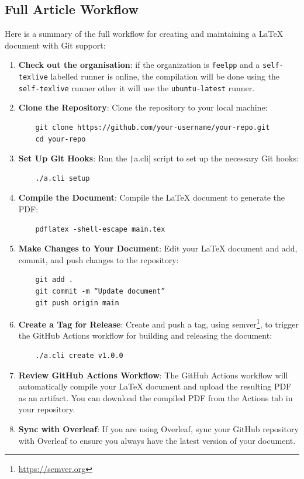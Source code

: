 \documentclass[a4paper]{article}
\begin{document}
\subsection{Full Article Workflow}
\label{sec:full-article-workflow}


Here is a summary of the full workflow for creating and maintaining a \LaTeX{} document with Git support:

\begin{enumerate}
    \item \textbf{Check out the organisation}: if the organization is \texttt{feelpp} and a \texttt{self-texlive} labelled runner is online, the compilation will be done using the \texttt{self-texlive} runner other it will use the \texttt{ubuntu-latest} runner.
    \item \textbf{Clone the Repository}:
    Clone the repository to your local machine:
    \begin{verbatim}
    git clone https://github.com/your-username/your-repo.git
    cd your-repo
    \end{verbatim}
    \item \textbf{Set Up Git Hooks}:
    Run the \texttt|a.cli| script to set up the necessary Git hooks:
    \begin{verbatim}
    ./a.cli setup
    \end{verbatim}
    \item  \textbf{Compile the Document}:
    Compile the \LaTeX{} document to generate the PDF:
    \begin{verbatim}
    pdflatex -shell-escape main.tex
    \end{verbatim}
    \item \textbf{Make Changes to Your Document}:
    Edit your \LaTeX{} document and add, commit, and push changes to the repository:
    \begin{verbatim}
    git add .
    git commit -m “Update document”
    git push origin main
    \end{verbatim}
    \item \textbf{Create a Tag for Release}:
    Create and push a tag, using semver\footnote{\url{https://semver.org}},  to trigger the GitHub Actions workflow for building and releasing the document:
    \begin{verbatim}
    ./a.cli create v1.0.0
    \end{verbatim}
    \item \textbf{Review GitHub Actions Workflow}:
    The GitHub Actions workflow will automatically compile your \LaTeX{} document and upload the resulting PDF as an artifact.
    You can download the compiled PDF from the Actions tab in your repository.
    \item \textbf{Sync with Overleaf}:
    If you are using Overleaf, sync your GitHub repository with Overleaf to ensure you always have the latest version of your document.
\end{enumerate}
\end{document}
